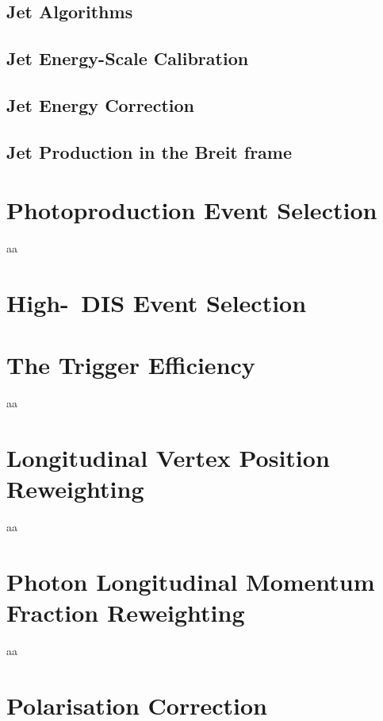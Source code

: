 \subsection{Jet Algorithms}
\label{subsec:jetalgo}


\subsection{Jet Energy-Scale Calibration}
\label{subsec:jetcalib}


\subsection{Jet Energy Correction}
\label{subsec:jetcor}


\subsection{Jet Production in the Breit frame}
\label{subsec:jetsinbreit}


\section{Photoproduction Event Selection}
\label{sec:photosel}
aa
\section{High-\qsq\, DIS Event Selection}
\label{sec:dissel}


\section{The Trigger Efficiency}
\label{sec:trigeff}
aa
\section{Longitudinal Vertex Position Reweighting}
\label{sec:zvtxrew}
aa
\section{Photon Longitudinal Momentum Fraction Reweighting}
\label{sec:yrew}
aa
\section{Polarisation Correction}
\label{sec:polcor}